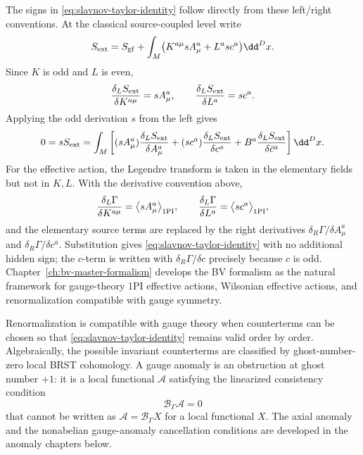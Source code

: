 The signs in \eqref{eq:slavnov-taylor-identity} follow directly from these
left/right conventions.  At the classical source-coupled level write
\[
  S_{\rm ext}
  =
  S_{\rm gf}
  +
  \int_M
  \bigl(K^{a\mu}sA_\mu^a+L^a sc^a\bigr)\dd^D x .
\]
Since \(K\) is odd and \(L\) is even,
\[
  \frac{\delta_L S_{\rm ext}}{\delta K^{a\mu}}=sA_\mu^a,
  \qquad
  \frac{\delta_L S_{\rm ext}}{\delta L^a}=sc^a .
\]
Applying the odd derivation \(s\) from the left gives
\[
  0=sS_{\rm ext}
  =
  \int_M
  \left[
    (sA_\mu^a)\frac{\delta_L S_{\rm ext}}{\delta A_\mu^a}
    +(sc^a)\frac{\delta_L S_{\rm ext}}{\delta c^a}
    +B^a\frac{\delta_L S_{\rm ext}}{\delta\bar c^a}
  \right]\dd^D x .
\]
For the effective action, the Legendre transform is taken in the elementary
fields but not in \(K,L\).  With the derivative convention above,
\[
  \frac{\delta_L\Gamma}{\delta K^{a\mu}}
  =
  \bigl\langle sA_\mu^a\bigr\rangle_{\rm 1PI},
  \qquad
  \frac{\delta_L\Gamma}{\delta L^a}
  =
  \bigl\langle sc^a\bigr\rangle_{\rm 1PI},
\]
and the elementary source terms are replaced by the right derivatives
\(\delta_R\Gamma/\delta A_\mu^a\) and
\(\delta_R\Gamma/\delta c^a\).  Substitution gives
\eqref{eq:slavnov-taylor-identity} with no additional hidden sign; the
\(c\)-term is written with \(\delta_R\Gamma/\delta c\) precisely because \(c\)
is odd.
Chapter~\ref{ch:bv-master-formalism} develops the BV formalism as the natural
framework for gauge-theory
1PI effective actions, Wilsonian effective actions, and renormalization
compatible with gauge symmetry.

Renormalization is compatible with gauge theory when counterterms can be
chosen so that \eqref{eq:slavnov-taylor-identity} remains valid order by
order.  Algebraically, the possible invariant counterterms are classified by
ghost-number-zero local BRST cohomology.  A gauge anomaly is an obstruction at
ghost number \(+1\): it is a local functional \(\mathcal A\) satisfying the
linearized consistency condition
\[
  \mathcal B_\Gamma\mathcal A=0
\]
that cannot be written as \(\mathcal A=\mathcal B_\Gamma X\) for a local
functional \(X\).  The axial anomaly and the nonabelian gauge-anomaly
cancellation conditions are developed in the anomaly chapters below.
